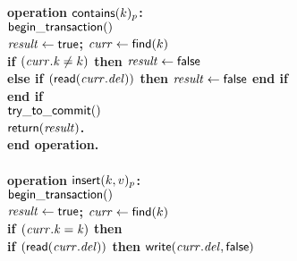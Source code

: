 \begin{figure}[h!]
{{\begin{minipage}[t]{150mm}
\begin{tabbing}
\bf{operation} $\act{contains}(k)_p$: \\
		 \> $\lit{begin\_transaction}()$ \\
		 \> $\ms{result} \gets \lit{true}$; $\ms{curr} \gets \lit{find}(k)$ \\%
		 \> \bf{if} $(\ms{curr.k} \neq k)$ \bf{then} $\ms{result} \gets \lit{false}$ \\%
		 \>\> \bf{else if} $(\lit{read}(\ms{curr.del}))$ \bf{then} $\ms{result} \gets \lit{false}$ \bf{end if}\\%
		 \> \bf{end if} \\
		 \> $\lit{try\_to\_commit}()$ \\
		 \> $\sf{return}(\ms{result})$. \\%
{\bf end operation}. \\
\\
   		
\bf{operation} $\act{insert}(k,v)_p$: \\
		 \> $\lit{begin\_transaction}()$ \\
		 \> $\ms{result} \gets \lit{true}$; $\ms{curr} \gets \lit{find}(k)$  \\%
		 \> \bf{if} $(\ms{curr.k} = \ms{k})$ \bf{then} \\
		 \>\>\> \bf{if} $(\lit{read}(\ms{curr.del}))$ \bf{then} $\lit{write}(\ms{curr.del}, \lit{false})$ \\%
						

\end{tabbing}
\end{minipage}}}
\end{figure}
